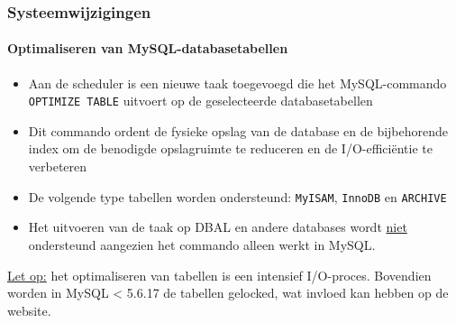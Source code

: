 \begin{frame}[fragile]
	\frametitle{Systeemwijzigingen}
	\framesubtitle{Optimaliseren van MySQL-databasetabellen}

	\begin{itemize}

		\item Aan de scheduler is een nieuwe taak toegevoegd die het MySQL-commando \texttt{OPTIMIZE TABLE}
			uitvoert op de geselecteerde databasetabellen

		\item Dit commando ordent de fysieke opslag van de database en de bijbehorende index
			om de benodigde opslagruimte te reduceren en de I/O-efficiëntie te verbeteren

		\item De volgende type tabellen worden ondersteund:\newline
			\texttt{MyISAM}, \texttt{InnoDB} en \texttt{ARCHIVE}

		\item Het uitvoeren van de taak op DBAL en andere databases wordt \underline{niet} ondersteund
			aangezien het commando alleen werkt in MySQL.

	\end{itemize}


	\begingroup
		\color{red}
			\smaller
				\underline{Let op:} het optimaliseren van tabellen is een intensief I/O-proces.
				Bovendien worden in MySQL < 5.6.17 de tabellen gelocked, wat invloed kan hebben op de website.
			\normalsize
	\endgroup

\end{frame}


